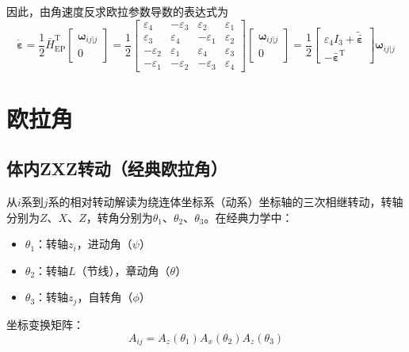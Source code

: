 因此，由角速度反求欧拉参数导数的表达式为
\begin{equation}
\dot{\boldsymbol{\varepsilon}} = \frac{1}{2}\bar{H}_{\mathrm{EP}}^{\mathrm{T}}
\begin{bmatrix}
\boldsymbol{\omega}_{ij|j} \\ 0
\end{bmatrix}
= \frac{1}{2}
\begin{bmatrix}
\varepsilon_4  & -\varepsilon_3 & \varepsilon_2  & \varepsilon_1  \\
\varepsilon_3  & \varepsilon_4  & -\varepsilon_1 & \varepsilon_2  \\
-\varepsilon_2 & \varepsilon_1  & \varepsilon_4  & \varepsilon_3  \\
-\varepsilon_1 & -\varepsilon_2 & -\varepsilon_3 & \varepsilon_4
\end{bmatrix}
\begin{bmatrix}
\boldsymbol{\omega}_{ij|j} \\ 0
\end{bmatrix}
= \frac{1}{2}
\begin{bmatrix}
\varepsilon_4 I_3 + \tilde{\bar{\boldsymbol{\varepsilon}}} \\[2pt]
-\bar{\boldsymbol{\varepsilon}}^{\mathrm{T}}
\end{bmatrix}
\boldsymbol{\omega}_{ij|j}
\label{eq:7.11}
\end{equation}

\section{欧拉角}

\subsection{体内ZXZ转动（经典欧拉角）}

从$i$系到$j$系的相对转动解读为绕连体坐标系（动系）坐标轴的三次相继转动，转轴分别为$Z$、$X$、$Z$，转角分别为$\theta_1$、$\theta_2$、$\theta_3$。在经典力学中：
\begin{itemize}
\item $\theta_1$：转轴$z_i$，进动角（$\psi$）
\item $\theta_2$：转轴$L$（节线），章动角（$\theta$）
\item $\theta_3$：转轴$z_j$，自转角（$\phi$）
\end{itemize}

坐标变换矩阵：
\begin{equation}
A_{ij} = A_z(\theta_1)A_x(\theta_2)A_z(\theta_3)
\end{equation}

